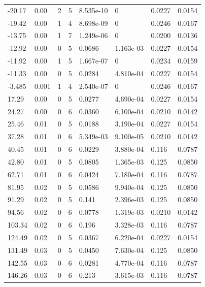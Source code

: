 \documentclass[preview]{standalone}
\begin{document}
{{\begin{tabular}{L{1.2cm}C{1.2cm} C{0.3cm}C{0.5cm} C{1.4cm}C{1.4cm} C{1.4cm}C{1.4cm}}
  -20.17  &  0.00  & 2     &  5 &  8.535e-10  & 0  & 0.0227 &  0.0154   \\ 
  -19.42  &  0.00  & 1     &  4 &  8.698e-09  & 0  & 0.0246 &  0.0167   \\ 
  -13.75  &  0.00  & 1     &  7 &  1.249e-06  & 0  & 0.0200 &  0.0136   \\ 
  -12.92  &  0.00  & 0     &  5 &  0.0686  & 1.163e-03  & 0.0227 &  0.0154   \\ 
  -11.92  &  0.00  & 1     &  5 &  1.667e-07  & 0  & 0.0234 &  0.0159   \\ 
  -11.33  &  0.00  & 0     &  5 &  0.0284  & 4.810e-04  & 0.0227 &  0.0154   \\ 
  -3.485  &  0.001  & 1     &  4 &  2.540e-07  & 0  & 0.0246 &  0.0167   \\ 
  17.29  &  0.00  & 0     &  5 &  0.0277  & 4.690e-04  & 0.0227 &  0.0154   \\ 
  24.27  &  0.00  & 0     &  6 &  0.0360  & 6.100e-04  & 0.0210 &  0.0142   \\ 
  25.46  &  0.01  & 0     &  5 &  0.0188  & 3.190e-04  & 0.0227 &  0.0154   \\ 
  37.28  &  0.01  & 0     &  6 &  5.349e-03  & 9.100e-05  & 0.0210 &  0.0142   \\ 
  40.45  &  0.01  & 0     &  6 &  0.0229  & 3.880e-04  & 0.116 &  0.0787   \\ 
  42.80  &  0.01  & 0     &  5 &  0.0805  & 1.365e-03  & 0.125 &  0.0850   \\ 
  62.71  &  0.01  & 0     &  6 &  0.0424  & 7.180e-04  & 0.116 &  0.0787   \\ 
  81.95  &  0.02  & 0     &  5 &  0.0586  & 9.940e-04  & 0.125 &  0.0850   \\ 
  91.29  &  0.02  & 0     &  5 &  0.141  & 2.396e-03  & 0.125 &  0.0850   \\ 
  94.56  &  0.02  & 0     &  6 &  0.0778  & 1.319e-03  & 0.0210 &  0.0142   \\ 
  103.34  &  0.02  & 0     &  6 &  0.196  & 3.328e-03  & 0.116 &  0.0787   \\ 
  124.49  &  0.02  & 0     &  5 &  0.0367  & 6.220e-04  & 0.0227 &  0.0154   \\ 
  131.49  &  0.03  & 0     &  5 &  0.0450  & 7.630e-04  & 0.125 &  0.0850   \\ 
  142.55  &  0.03  & 0     &  6 &  0.0281  & 4.770e-04  & 0.116 &  0.0787   \\ 
  146.26  &  0.03  & 0     &  6 &  0.213  & 3.615e-03  & 0.116 &  0.0787   \\ 

\end{tabular}}}
\end{document}
